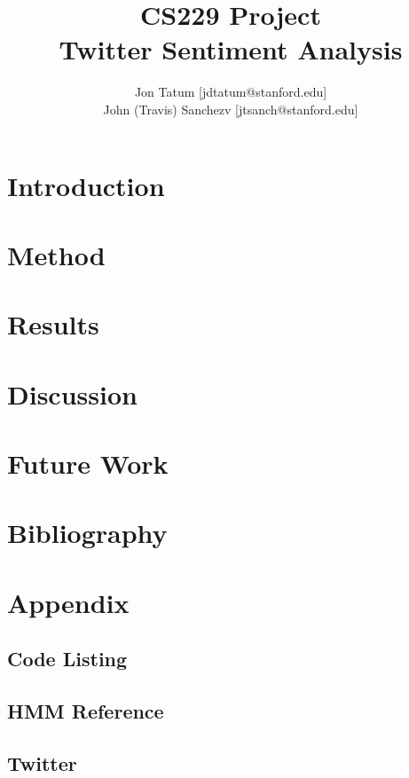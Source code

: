 \documentclass[11pt,letterpaper]{article}
\author{	Jon Tatum [jdtatum@stanford.edu] \\
		John (Travis) Sanchezv [jtsanch@stanford.edu]}
\title{	CS229 Project \\
		Twitter Sentiment Analysis}
\begin{document}
\maketitle
\hrulefill


\section{Introduction}
	
\section{Method}
	
\section{Results}
	
\section{Discussion}
	
\section{Future Work}
	 
\section{Bibliography}
\section{Appendix}
	\subsection{Code Listing}
	\subsection{HMM Reference}
	\subsection{Twitter}
	
\end{document}
